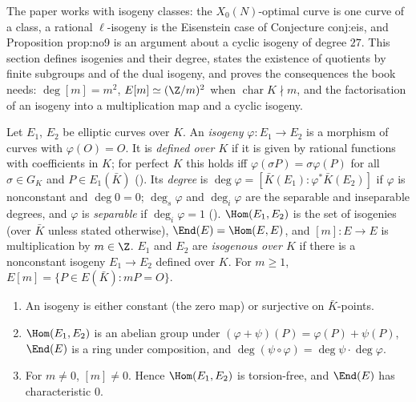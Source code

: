 The paper works with isogeny classes: the $X_0(N)$-optimal curve is one curve of a class, a rational $\ell$-isogeny is the Eisenstein
case of Conjecture conj:eis, and Proposition prop:no9 is an argument about a cyclic isogeny of degree $27$. This section defines
isogenies and their degree, states the existence of quotients by finite subgroups and of the dual isogeny, and proves the consequences
the book needs: $\deg[m]=m^2$, $E[m]\simeq(\Z/m)^2$ when $\operatorname{char}K\nmid m$, and the factorisation of an isogeny into a
multiplication map and a cyclic isogeny.

\begin{definition}[isogenies]\label{def:ellcurves:isogeny}
Let $E_1$, $E_2$ be elliptic curves over $K$. An \emph{isogeny} $\varphi\colon E_1\to E_2$ is a morphism of curves with $\varphi(O)=O$. It is
\emph{defined over $K$} if it is given by rational functions with coefficients in $K$; for perfect $K$ this holds iff $\varphi(\sigma P)=\sigma\varphi(P)$
for all $\sigma\in G_K$ and $P\in E_1(\bar K)$ (). Its \emph{degree} is $\deg\varphi=[\bar K(E_1):\varphi^*\bar K(E_2)]$ if $\varphi$ is
nonconstant and $\deg0=0$; $\deg_s\varphi$ and $\deg_i\varphi$ are the separable and inseparable degrees, and $\varphi$ is \emph{separable} if
$\deg_i\varphi=1$ (). $\Hom(E_1,E_2)$ is the set of isogenies (over $\bar K$ unless stated otherwise), $\End(E)=\Hom(E,E)$, and
$[m]\colon E\to E$ is multiplication by $m\in\Z$. $E_1$ and $E_2$ are \emph{isogenous over $K$} if there is a nonconstant isogeny $E_1\to E_2$ defined
over $K$. For $m\ge1$, $E[m]=\{P\in E(\bar K):mP=O\}$.
\end{definition}

\begin{proposition}\label{prop:ellcurves:isogeny-basic}
\leavevmode
\begin{enumerate}[label=(\roman*)]
\item An isogeny is either constant (the zero map) or surjective on $\bar K$-points.
\item $\Hom(E_1,E_2)$ is an abelian group under $(\varphi+\psi)(P)=\varphi(P)+\psi(P)$, $\End(E)$ is a ring under composition, and
$\deg(\psi\circ\varphi)=\deg\psi\cdot\deg\varphi$.
\item For $m\ne0$, $[m]\ne0$. Hence $\Hom(E_1,E_2)$ is torsion-free, and $\End(E)$ has characteristic $0$.
\end{enumerate}
\end{proposition}

